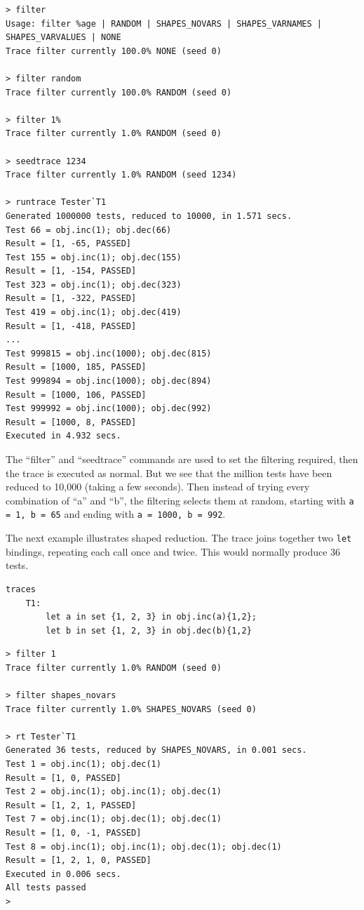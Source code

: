 \documentclass{overturerepchap}
\begin{document}
\lstset{style=tool,language=}
\scriptsize
\begin{lstlisting}[escapechar=@]
> filter
Usage: filter %age | RANDOM | SHAPES_NOVARS | SHAPES_VARNAMES | SHAPES_VARVALUES | NONE
Trace filter currently 100.0% NONE (seed 0)
 
> filter random
Trace filter currently 100.0% RANDOM (seed 0)

> filter 1%
Trace filter currently 1.0% RANDOM (seed 0)

> seedtrace 1234
Trace filter currently 1.0% RANDOM (seed 1234)

> runtrace Tester`T1
Generated 1000000 tests, reduced to 10000, in 1.571 secs. 
Test 66 = obj.inc(1); obj.dec(66)
Result = [1, -65, PASSED]
Test 155 = obj.inc(1); obj.dec(155)
Result = [1, -154, PASSED]
Test 323 = obj.inc(1); obj.dec(323)
Result = [1, -322, PASSED]
Test 419 = obj.inc(1); obj.dec(419)
Result = [1, -418, PASSED]
...
Test 999815 = obj.inc(1000); obj.dec(815)
Result = [1000, 185, PASSED]
Test 999894 = obj.inc(1000); obj.dec(894)
Result = [1000, 106, PASSED]
Test 999992 = obj.inc(1000); obj.dec(992)
Result = [1000, 8, PASSED]
Executed in 4.932 secs. 
\end{lstlisting}
\lstset{style=mystyle}
\lstset{language=VDM++}
\normalsize

The ``filter'' and ``seedtrace'' commands are used to set the filtering
required, then the trace is executed as normal. But we see that the million
tests have been reduced to 10,000 (taking a few seconds). Then instead of trying
every combination of ``a'' and ``b'', the filtering selects them at random,
starting with \texttt{a = 1, b = 65} and ending with \texttt{a = 1000, b = 992}.

The next example illustrates shaped reduction. The trace joins together two
\texttt{let} bindings, repeating each call once and twice. This would normally
produce 36 tests.

\small
\begin{lstlisting}
traces
    T1:
        let a in set {1, 2, 3} in obj.inc(a){1,2};
        let b in set {1, 2, 3} in obj.dec(b){1,2}
\end{lstlisting}

\lstset{style=tool,language=}
\begin{lstlisting}
> filter 1
Trace filter currently 1.0% RANDOM (seed 0)

> filter shapes_novars
Trace filter currently 1.0% SHAPES_NOVARS (seed 0)

> rt Tester`T1
Generated 36 tests, reduced by SHAPES_NOVARS, in 0.001 secs. 
Test 1 = obj.inc(1); obj.dec(1)
Result = [1, 0, PASSED]
Test 2 = obj.inc(1); obj.inc(1); obj.dec(1)
Result = [1, 2, 1, PASSED]
Test 7 = obj.inc(1); obj.dec(1); obj.dec(1)
Result = [1, 0, -1, PASSED]
Test 8 = obj.inc(1); obj.inc(1); obj.dec(1); obj.dec(1)
Result = [1, 2, 1, 0, PASSED]
Executed in 0.006 secs. 
All tests passed
>
\end{lstlisting}
\lstset{style=mystyle}
\lstset{language=VDM++}
\normalsize
\end{document}

